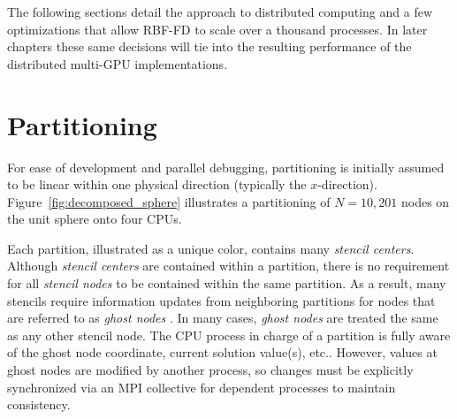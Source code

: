 \documentclass{report}
\begin{document}
The following sections detail the approach to distributed computing and a few optimizations that allow RBF-FD to scale over a thousand processes. In later chapters these same decisions will tie into the resulting performance of the distributed multi-GPU implementations. 



%
%
%
%


\section{Partitioning}

For ease of development and parallel debugging, partitioning is initially
assumed to be linear within one physical direction (typically the
$x$-direction). Figure~\ref{fig:decomposed_sphere} illustrates a partitioning of
$N=10,201$ nodes on the unit sphere onto four CPUs.

Each partition, illustrated
as a unique color, contains many \emph{stencil centers}. Although \emph{stencil centers} are contained within a partition, there is no requirement for all \emph{stencil nodes} to be contained within the same partition. As a result, many stencils require information updates from neighboring partitions for nodes that are referred to as \emph{ghost nodes} \cite{NeEDREF}. %
In many cases, \emph{ghost nodes} are treated the same as any other stencil node. The CPU process in charge of a partition is fully aware of the ghost node coordinate, current solution value(s), etc.. However, values at ghost nodes are modified by another process, so changes must be explicitly synchronized via an MPI collective for dependent processes to maintain consistency. 
\end{document}
